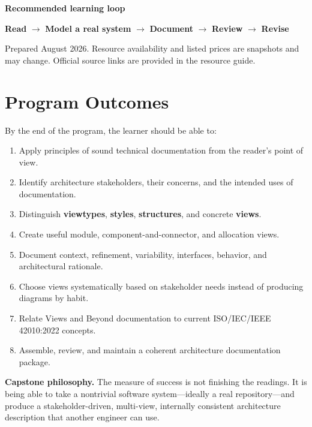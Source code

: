 \documentclass[10pt,letterpaper]{article}
\begin{document}
\vfill
\begin{tcolorbox}[
  enhanced,
  colback=PaleGold,
  colframe=Gold,
  boxrule=0.7pt,
  arc=2pt,
  left=10pt,right=10pt,top=8pt,bottom=8pt]
\textbf{Recommended learning loop}\par
\centering\large
\textbf{Read} $\rightarrow$ \textbf{Model a real system} $\rightarrow$ \textbf{Document} $\rightarrow$ \textbf{Review} $\rightarrow$ \textbf{Revise}
\end{tcolorbox}

\vspace{0.9em}
{\small\color{Slate}
Prepared August 2026. Resource availability and listed prices are snapshots and may change. Official source links are provided in the resource guide.}
\newpage

\section{Program Outcomes}

By the end of the program, the learner should be able to:

\begin{enumerate}
  \item Apply principles of sound technical documentation from the reader's point of view.
  \item Identify architecture stakeholders, their concerns, and the intended uses of documentation.
  \item Distinguish \textbf{viewtypes}, \textbf{styles}, \textbf{structures}, and concrete \textbf{views}.
  \item Create useful module, component-and-connector, and allocation views.
  \item Document context, refinement, variability, interfaces, behavior, and architectural rationale.
  \item Choose views systematically based on stakeholder needs instead of producing diagrams by habit.
  \item Relate Views and Beyond documentation to current ISO/IEC/IEEE 42010:2022 concepts.
  \item Assemble, review, and maintain a coherent architecture documentation package.
\end{enumerate}

\begin{keybox}
\textbf{Capstone philosophy.} The measure of success is not finishing the readings. It is being able to take a nontrivial software system---ideally a real repository---and produce a stakeholder-driven, multi-view, internally consistent architecture description that another engineer can use.
\end{keybox}
\end{document}
